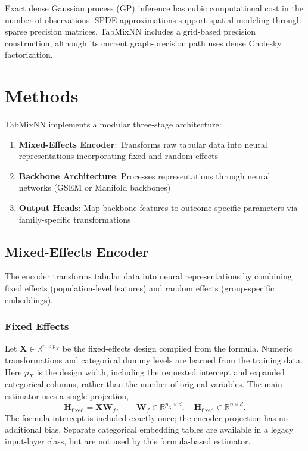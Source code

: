 \documentclass[12pt,a4paper]{article}
\newcommand{\R}{\mathbb{R}}
\newcommand{\bX}{\mathbf{X}}
\begin{document}
Exact dense Gaussian process (GP) inference has cubic computational cost in the number of observations. SPDE approximations \citep{lindgren2011explicit} support spatial modeling through sparse precision matrices. TabMixNN includes a grid-based precision construction, although its current graph-precision path uses dense Cholesky factorization.

\section{Methods}
\label{sec:methods}

TabMixNN implements a modular three-stage architecture:

\begin{enumerate}
    \item \textbf{Mixed-Effects Encoder}: Transforms raw tabular data into neural representations incorporating fixed and random effects
    \item \textbf{Backbone Architecture}: Processes representations through neural networks (GSEM or Manifold backbones)
    \item \textbf{Output Heads}: Map backbone features to outcome-specific parameters via family-specific transformations
\end{enumerate}

\subsection{Mixed-Effects Encoder}
\label{sec:encoder}

The encoder transforms tabular data into neural representations by combining fixed effects (population-level features) and random effects (group-specific embeddings).

\subsubsection{Fixed Effects}

Let $\bX \in \R^{n\times p_X}$ be the fixed-effects design compiled from the formula. Numeric transformations and categorical dummy levels are learned from the training data. Here $p_X$ is the design width, including the requested intercept and expanded categorical columns, rather than the number of original variables. The main estimator uses a single projection,
\begin{equation}
 \mathbf{H}_{\mathrm{fixed}}=\bX\mathbf{W}_f,\qquad
 \mathbf{W}_f\in\R^{p_X\times d},\quad
 \mathbf{H}_{\mathrm{fixed}}\in\R^{n\times d}.
\end{equation}
The formula intercept is included exactly once; the encoder projection has no additional bias. Separate categorical embedding tables are available in a legacy input-layer class, but are not used by this formula-based estimator.
\end{document}
